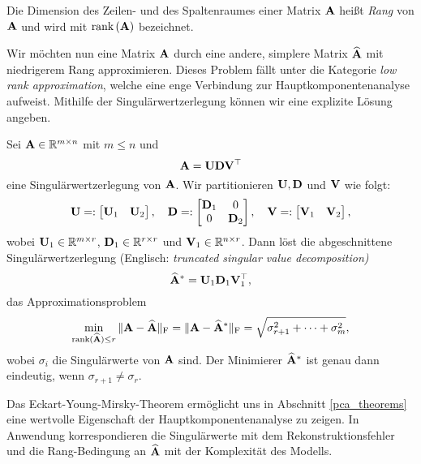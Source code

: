 \begin{defn}
Die Dimension des Zeilen- und des Spaltenraumes einer Matrix $\mathbf{A}$ heißt \textit{Rang} von $\mathbf{A}$ und wird mit $\text{rank} \left( \mathbf{A} \right)$ bezeichnet.
\end{defn}

Wir möchten nun eine Matrix $\mathbf{A}$ durch eine andere, simplere Matrix $\widehat{\mathbf{A}}$ mit niedrigerem Rang approximieren. Dieses Problem fällt unter die Kategorie \textit{low rank approximation}, welche eine enge Verbindung zur Hauptkomponentenanalyse aufweist. Mithilfe der Singulärwertzerlegung können wir eine explizite Lösung angeben.

\begin{thm}
Sei $\mathbf{A} \in \mathbb{R}^{m \times n}$ mit $m \leq n$ und 
$$\mathbf{A} = \mathbf{U}\mathbf{D} \mathbf{V}^{\top}$$
eine Singulärwertzerlegung von $\mathbf{A}$. Wir partitionieren $\mathbf{U}, \mathbf{D}$ und $\mathbf{V}$ wie folgt:
$$\mathbf{U} =: \begin{bmatrix} \mathbf{U}_1 & \mathbf{U}_2\end{bmatrix}, \quad 
\mathbf{D} =: \begin{bmatrix} \mathbf{D}_1 & 0 \\ 0 & \mathbf{D}_2 \end{bmatrix},\quad \mathbf{V} =: \begin{bmatrix} \mathbf{V}_1 & \mathbf{V}_2 \end{bmatrix},$$
wobei $\mathbf{U}_{1} \in \mathbb{R}^{m\times r}$, $\mathbf{D} _{1} \in \mathbb{R}^{r\times r}$ und $\mathbf{V}_{1} \in \mathbb{R}^{n\times r}$. Dann löst die abgeschnittene Singulärwertzerlegung (Englisch: \textit{truncated singular value decomposition)}
$$\widehat{\mathbf{A}}^* = \mathbf{U}_1 \mathbf{D}_1 \mathbf{V}_1^{\top},$$
das Approximationsproblem
\begin{align}
\min_{\operatorname{rank}(\widehat{\mathbf{A}}) \leq r} \|\mathbf{A}-\widehat{\mathbf{A}}\|_{\text{F}} = \|\mathbf{A}-\widehat{\mathbf{A}}^*\|_{\text{F}} = \sqrt{\sigma^2_{r+1} + \cdots + \sigma^2_m},
\end{align}
wobei $\sigma_i$ die Singulärwerte von $\mathbf{A}$ sind. Der Minimierer $\widehat{\mathbf{A}}^*$ ist genau dann eindeutig, wenn $\sigma_{r+1} \neq \sigma_{r}$.
\end{thm}

Das Eckart-Young-Mirsky-Theorem ermöglicht uns in Abschnitt \ref{pca_theorems} eine wertvolle Eigenschaft der Hauptkomponentenanalyse zu zeigen. In Anwendung korrespondieren die Singulärwerte mit dem Rekonstruktionsfehler und die Rang-Bedingung an $\widehat{\mathbf{A}}$ mit der Komplexität des Modells.

